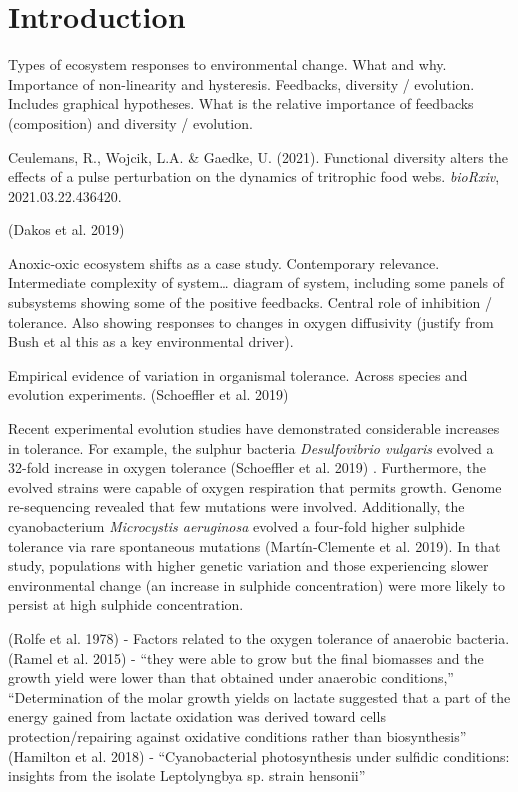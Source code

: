 \documentclass{article}
\begin{document}
\hypertarget{introduction}{%
\section{Introduction}\label{introduction}}

Types of ecosystem responses to environmental change. What and why.
Importance of non-linearity and hysteresis. Feedbacks, diversity /
evolution. Includes graphical hypotheses. What is the relative
importance of feedbacks (composition) and diversity / evolution.

Ceulemans, R., Wojcik, L.A. \& Gaedke, U. (2021). Functional diversity
alters the effects of a pulse perturbation on the dynamics of tritrophic
food webs. \emph{bioRxiv}, 2021.03.22.436420.

(Dakos et al. 2019)

Anoxic-oxic ecosystem shifts as a case study. Contemporary relevance.
Intermediate complexity of system\ldots{} diagram of system, including
some panels of subsystems showing some of the positive feedbacks.
Central role of inhibition / tolerance. Also showing responses to
changes in oxygen diffusivity (justify from Bush et al this as a key
environmental driver).

Empirical evidence of variation in organismal tolerance. Across species
and evolution experiments. (Schoeffler et al. 2019)

Recent experimental evolution studies have demonstrated considerable
increases in tolerance. For example, the sulphur bacteria
\emph{Desulfovibrio vulgaris} evolved a 32-fold increase in oxygen
tolerance (Schoeffler et al. 2019) . Furthermore, the evolved strains
were capable of oxygen respiration that permits growth. Genome
re-sequencing revealed that few mutations were involved. Additionally,
the cyanobacterium \emph{Microcystis aeruginosa} evolved a four-fold
higher sulphide tolerance via rare spontaneous mutations
(Martín-Clemente et al. 2019). In that study, populations with higher
genetic variation and those experiencing slower environmental change (an
increase in sulphide concentration) were more likely to persist at high
sulphide concentration.

(Rolfe et al. 1978) - Factors related to the oxygen tolerance of
anaerobic bacteria. (Ramel et al. 2015) - ``they were able to grow but
the final biomasses and the growth yield were lower than that obtained
under anaerobic conditions,'' ``Determination of the molar growth yields
on lactate suggested that a part of the energy gained from lactate
oxidation was derived toward cells protection/repairing against
oxidative conditions rather than biosynthesis'' (Hamilton et al. 2018) -
``Cyanobacterial photosynthesis under sulfidic conditions: insights from
the isolate Leptolyngbya sp. strain hensonii''
\end{document}
